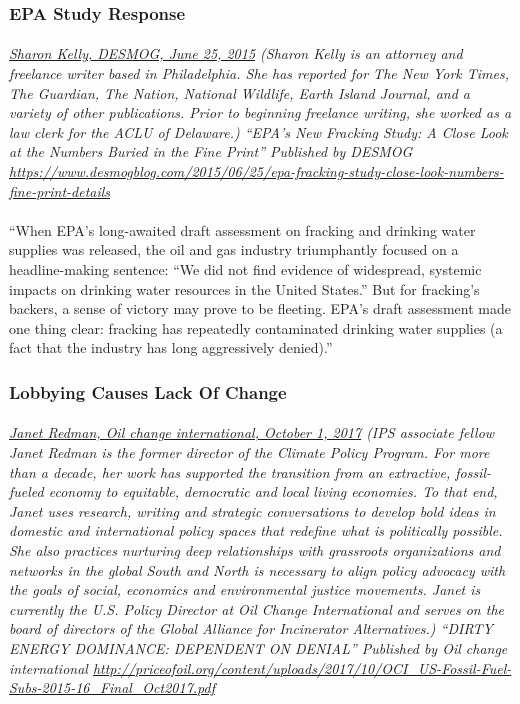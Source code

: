 \documentclass{article}
\begin{document}
\subsubsection{EPA Study Response}
\paragraph{}
\small
\textit{
\underline{Sharon Kelly, DESMOG,  June 25, 2015}
(Sharon Kelly is an attorney and freelance writer based in Philadelphia. She has reported for The New York Times, The Guardian, The Nation, National Wildlife, Earth Island Journal, and a variety of other publications. Prior to beginning freelance writing, she worked as a law clerk for the ACLU of Delaware.) “EPA's New Fracking Study: A Close Look at the Numbers Buried in the Fine Print” Published by DESMOG  
\url{https://www.desmogblog.com/2015/06/25/epa-fracking-study-close-look-numbers-fine-print-details}}
\normalsize

\paragraph{}
``When EPA’s long-awaited draft assessment on fracking and drinking water supplies was released, the oil and gas industry triumphantly focused on a headline-making sentence: “We did not find evidence of widespread, systemic impacts on drinking water resources in the United States.” But for fracking’s backers, a sense of victory may prove to be fleeting. EPA’s draft assessment made one thing clear: fracking has repeatedly contaminated drinking water supplies (a fact that the industry has long aggressively denied).”

\subsubsection{Lobbying Causes Lack Of Change}
\paragraph{}
\small
\textit{
\underline{Janet Redman, Oil change international, October 1, 2017}
(IPS associate fellow Janet Redman is the former director of the Climate Policy Program. For more than a decade, her work has supported the transition from an extractive, fossil-fueled economy to equitable, democratic and local living economies. To that end, Janet uses research, writing and strategic conversations to develop bold ideas in domestic and international policy spaces that redefine what is politically possible. She also practices nurturing deep relationships with grassroots organizations and networks in the global South and North is necessary to align policy advocacy with the goals of social, economics and environmental justice movements. Janet is currently the U.S. Policy Director at Oil Change International and serves on the board of directors of the Global Alliance for Incinerator Alternatives.) “DIRTY ENERGY DOMINANCE: DEPENDENT ON DENIAL” Published by Oil change international
\url{http://priceofoil.org/content/uploads/2017/10/OCI_US-Fossil-Fuel-Subs-2015-16_Final_Oct2017.pdf }}
\normalsize
\end{document}
